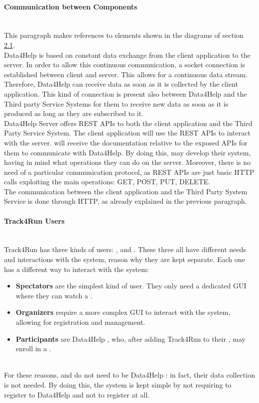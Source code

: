 \documentclass[../../DD.tex]{subfiles}
\begin{document}
	\paragraph{Communication between Components}\mbox{}\\
	This paragraph makes references to elements shown in the diagrams of section \hyperref[sect:2.1]{2.1}.\\
	Data4Help is based on constant data exchange from the client application to the server. In order to allow this continuous communication, a socket connection is established between client and server. This allows for a continuous data stream. Therefore, Data4Help can receive data as soon as it is collected by the client application. This kind of connection is present also between Data4Help and the Third party Service Systems for them to receive new data as soon as it is produced as long as they are subscribed to it.\\
	Data4Help Server offers REST APIs to both the client application and the Third Party Service System. The client application will use the REST APIs to interact with the server.  will receive the documentation relative to the exposed APIs for them to communicate with Data4Help. By doing this,  may develop their system, having in mind what operations they can do on the server. Moreover, there is no need of a particular communication protocol, as REST APIs are just basic HTTP calls exploiting the main operations: GET, POST, PUT, DELETE.\\
	The communication between the client application and the Third Party System Service is done through HTTP, as already explained in the previous paragraph.

	\paragraph{Track4Run Users}\mbox{}\\
	Track4Run has three kinds of users: ,  and . These three all have different needs and interactions with the system, reason why they are kept separate. Each one has a different way to interact with the system:
	\begin{itemize}
		\item\textbf{Spectators} are the simplest kind of user. They only need a dedicated GUI where they can watch a .
		\item\textbf{Organizers} require a more complex GUI to interact with the system, allowing for registration and  management.
		\item\textbf{Participants} are Data4Help , who, after adding Track4Run to their , may enroll in a . 
	\end{itemize}\mbox{}\\
	For these reasons,  and  do not need to be Data4Help : in fact, their data collection is not needed. By doing this, the system is kept simple by not requiring  to register to Data4Help and  not to register at all.
\end{document}
